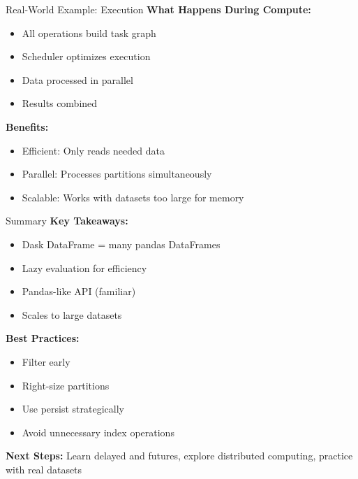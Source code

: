 \documentclass[aspectratio=169]{beamer}
\begin{document}
\begin{frame}{Real-World Example: Execution}
\small
\textbf{What Happens During Compute:}
\begin{itemize}
    \item All operations build task graph
    \item Scheduler optimizes execution
    \item Data processed in parallel
    \item Results combined
\end{itemize}

\vspace{0.2cm}
\textbf{Benefits:}
\begin{itemize}
    \item Efficient: Only reads needed data
    \item Parallel: Processes partitions simultaneously
    \item Scalable: Works with datasets too large for memory
\end{itemize}
\end{frame}

\begin{frame}\small
Summary
\textbf{Key Takeaways:}
\begin{itemize}
    \item Dask DataFrame = many pandas DataFrames
    \item Lazy evaluation for efficiency
    \item Pandas-like API (familiar)
    \item Scales to large datasets
\end{itemize}

\textbf{Best Practices:}
\begin{itemize}
    \item Filter early
    \item Right-size partitions
    \item Use persist strategically
    \item Avoid unnecessary index operations
\end{itemize}

\textbf{Next Steps:} Learn delayed and futures, explore distributed computing, practice with real datasets
\end{frame}
\end{document}
